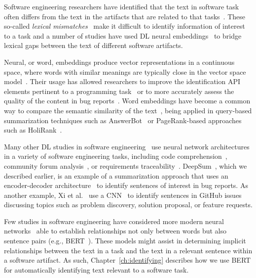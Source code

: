 Software engineering researchers have identified that the text 
in software task 
often differs from the text in the artifacts that are related to that tasks~\cite{Huang2018}. 
These so-called \textit{lexical mismatches}~\cite{Ye2016} 
 make it difficult to identify information of interest 
to a task and a number of studies have used \acs{DL}
neural embeddings~\cite{Mikolov2013} to bridge lexical gaps between the text of different software artifacts. 


Neural, or word, embeddings produce vector representations in a continuous space,
where words with similar meanings are typically close in the vector space model~\cite{harris1954distributional, mikolov2013efficient}. 
Their usage has allowed researchers to improve 
the identification API elements pertinent to a programming task~\cite{Ye2016} 
or to more accurately assess the quality of the content in bug reports~\cite{chaparro2019}.
Word embeddings have become a common way 
to compare the semantic similarity of the text~\cite{mihalcea2006},
being applied in query-based summarization techniques such as 
AnswerBot~\cite{Xu2017}
or PageRank-based approaches such as HoliRank~\cite{Ponzanelli2017}.



Many other \acs{DL} studies in software engineering~\cite{ferreira2021,li2018deep, watson2022}
use neural network architectures 
in a variety of software engineering tasks, including
code comprehension~\cite{allamanis2015, mi2018}, community forum analysis~\cite{Lin2018, wang2019}, or requirements traceability~\cite{chen2019, guo2017}.
DeepSum~\cite{Li2018}, which we described earlier, is an example of a 
summarization approach that uses an encoder-decoder architecture~\cite{cho2014-encoder-decoder}  to identify 
sentences of interest in bug reports. As another example,
Xi et al.~\cite{Xia2017} use a \ac{CNN}~\cite{krizhevsky2012CNN} 
to identify sentences in GitHub issues discussing topics such as 
problem discovery, solution proposal, or feature requests.



Few studies in software engineering have considered more modern neural networks~\cite{watson2022}
able to establish relationships not only between words but also sentence pairs (e.g., \acs{BERT}~\cite{Devlin2018Bert}). 
These models might assist in determining 
implicit relationships between the text in a task and the text in a relevant sentence within a software artifact.
As such, Chapter~\ref{ch:identifying} describes how we use \acs{BERT} for automatically 
identifying text relevant to a software task.
